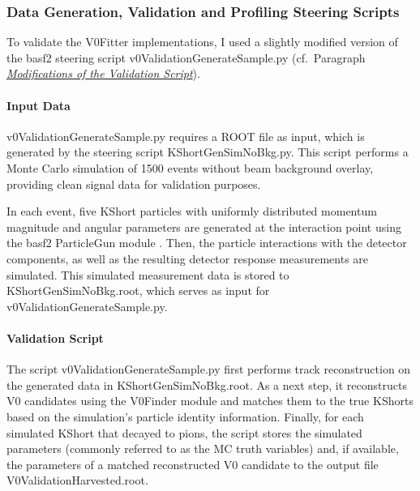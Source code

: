{
\sloppy
\newcommand{\genSample}{v0Validation\allowbreak Generate\allowbreak Sample.py\xspace}
\newcommand{\genSim}{KShort\allowbreak GenSim\allowbreak NoBkg.py\xspace}
\newcommand{\genSimRoot}{KShort\allowbreak GenSim\allowbreak NoBkg.root\xspace}
\newcommand{\genPlots}{v0Validation\allowbreak Create\allowbreak Plots.py\xspace}

\subsubsection{Data Generation, Validation and Profiling Steering Scripts}
To validate the V0Fitter implementations, I used a slightly modified version of the basf2 steering script \genSample \cite{v0ValidationGenerateSample} (cf.\ Paragraph \hyperref[par:val-mod]{\emph{Modifications of the Validation Script}}).

\paragraph{Input Data}
\genSample requires a ROOT file as input, which is generated by the steering script \genSim \cite{KShortGenSimNoBkg}.
This script performs a Monte Carlo simulation of 1500 events without beam background overlay, providing clean signal data for validation purposes.

In each event, five KShort particles with uniformly distributed momentum magnitude and angular parameters are generated at the interaction point using the basf2 ParticleGun module \cite{ParticleGun-sphinx}.
Then, the particle interactions with the detector components, as well as the resulting detector response measurements are simulated.
This simulated measurement data is stored to \genSimRoot, which serves as input for \genSample.

\paragraph{Validation Script}
The script \genSample first performs track reconstruction on the generated data in \genSimRoot.
As a next step, it reconstructs V0 candidates using the V0Finder module and matches them to the true KShorts based on the simulation's particle identity information.
Finally, for each simulated KShort that decayed to pions, the script stores the simulated parameters (commonly referred to as the MC truth variables) and, if available, the parameters of a matched reconstructed V0 candidate to the output file V0ValidationHarvested.root.

}

